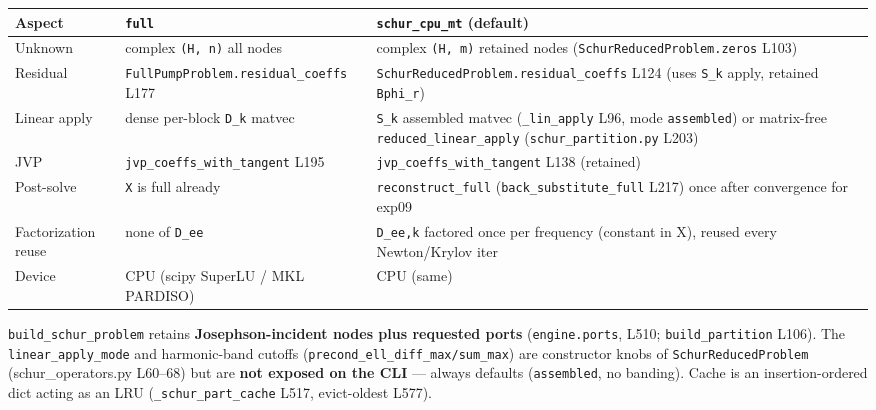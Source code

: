 \documentclass[
  10pt,
]{article}
\newcounter{none} %
\begin{document}
{\def\LTcaptype{none} %
\begin{longtable}[]{@{}
  >{\raggedright\arraybackslash}p{}
  >{\raggedright\arraybackslash}p{}
  >{\raggedright\arraybackslash}p{}@{}}
\toprule\noalign{}
\begin{minipage}[b]{\linewidth}\raggedright
Aspect
\end{minipage} & \begin{minipage}[b]{\linewidth}\raggedright
\texttt{full}
\end{minipage} & \begin{minipage}[b]{\linewidth}\raggedright
\texttt{schur\_cpu\_mt} (default)
\end{minipage} \\
\midrule\noalign{}
\endhead
\bottomrule\noalign{}
\endlastfoot
Unknown & complex \texttt{(H,\ n)} all nodes & complex \texttt{(H,\ m)}
retained nodes (\texttt{SchurReducedProblem.zeros} L103) \\
Residual & \texttt{FullPumpProblem.residual\_coeffs} L177 &
\texttt{SchurReducedProblem.residual\_coeffs} L124 (uses \texttt{S\_k}
apply, retained \texttt{Bphi\_r}) \\
Linear apply & dense per-block \texttt{D\_k} matvec & \texttt{S\_k}
assembled matvec (\texttt{\_lin\_apply} L96, mode \texttt{assembled}) or
matrix-free \texttt{reduced\_linear\_apply}
(\texttt{schur\_partition.py} L203) \\
JVP & \texttt{jvp\_coeffs\_with\_tangent} L195 &
\texttt{jvp\_coeffs\_with\_tangent} L138 (retained) \\
Post-solve & \texttt{X} is full already & \texttt{reconstruct\_full}
(\texttt{back\_substitute\_full} L217) once after convergence for
exp09 \\
Factorization reuse & none of \texttt{D\_ee} & \texttt{D\_ee,k} factored
once per frequency (constant in X), reused every Newton/Krylov iter \\
Device & CPU (scipy SuperLU / MKL PARDISO) & CPU (same) \\
\end{longtable}
}

\texttt{build\_schur\_problem} retains \textbf{Josephson-incident nodes
plus requested ports} (\texttt{engine.ports}, L510;
\texttt{build\_partition} L106). The \texttt{linear\_apply\_mode} and
harmonic-band cutoffs (\texttt{precond\_ell\_diff\_max/sum\_max}) are
constructor knobs of \texttt{SchurReducedProblem} (schur\_operators.py
L60--68) but are \textbf{not exposed on the CLI} --- always defaults
(\texttt{assembled}, no banding). Cache is an insertion-ordered dict
acting as an LRU (\texttt{\_schur\_part\_cache} L517, evict-oldest
L577).
\end{document}
